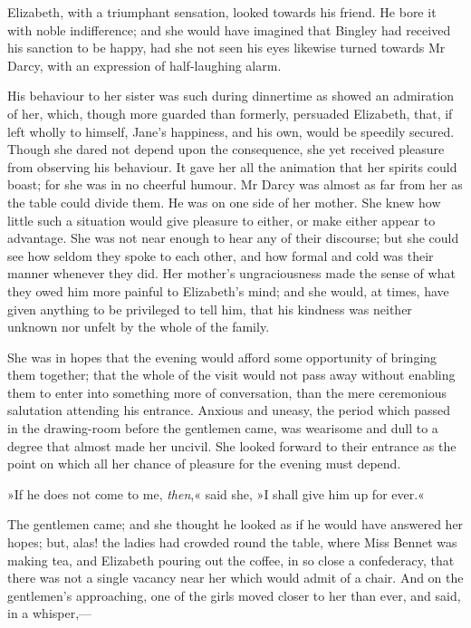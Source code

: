Elizabeth, with a triumphant sensation, looked towards his friend. He bore it with noble indifference; and she would have imagined that Bingley had received his sanction to be happy, had she not seen his eyes likewise turned towards Mr Darcy, with an expression of half-laughing alarm.

His behaviour to her sister was such during dinnertime as showed an admiration of her, which, though more guarded than formerly, persuaded Elizabeth, that, if left wholly to himself, Jane's happiness, and his own, would be speedily secured. Though she dared not depend upon the consequence, she yet received pleasure from observing his behaviour. It gave her all the animation that her spirits could boast; for she was in no cheerful humour. Mr Darcy was almost as far from her as the table could divide them. He was on one side of her mother. She knew how little such a situation would give pleasure to either, or make either appear to advantage. She was not near enough to hear any of their discourse; but she could see how seldom they spoke to each other, and how formal and cold was their manner whenever they did. Her mother's ungraciousness made the sense of what they owed him more painful to Elizabeth's mind; and she would, at times, have given anything to be privileged to tell him, that his kindness was neither unknown nor unfelt by the whole of the family.

She was in hopes that the evening would afford some opportunity of bringing them together; that the whole of the visit would not pass away without enabling them to enter into something more of conversation, than the mere ceremonious salutation attending his entrance. Anxious and uneasy, the period which passed in the drawing-room before the gentlemen came, was wearisome and dull to a degree that almost made her uncivil. She looked forward to their entrance as the point on which all her chance of pleasure for the evening must depend.

»If he does not come to me, \textit{then},« said she, »I shall give him up for ever.«

The gentlemen came; and she thought he looked as if he would have answered her hopes; but, alas! the ladies had crowded round the table, where Miss Bennet was making tea, and Elizabeth pouring out the coffee, in so close a confederacy, that there was not a single vacancy near her which would admit of a chair. And on the gentlemen's approaching, one of the girls moved closer to her than ever, and said, in a whisper,—


